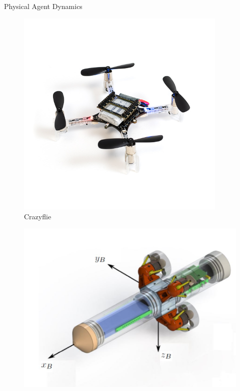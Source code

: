 \begin{frame}{Physical Agent Dynamics}	
	\begin{minipage}{0.3\textwidth}	
		\begin{figure}
			\includegraphics[width=0.9\textwidth]{figures/crazyflie_2_1_585px.jpg}
			\caption{Crazyflie}
		\end{figure}
	\end{minipage}
	\hspace{0.05cm}
	\begin{minipage}{0.3\textwidth}
		\begin{figure}
			\includegraphics[width=\textwidth]{figures/Hippocampus.jpg}

\end{figure}
\end{minipage}
\end{frame}
